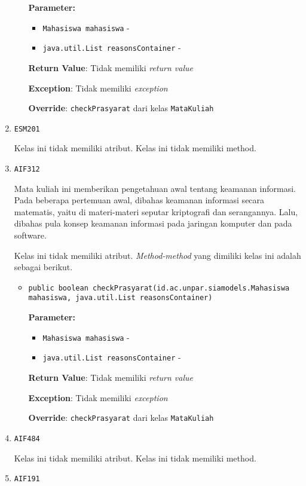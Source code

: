 \documentclass{article}
\begin{document}
\begin{enumerate}
\begin{itemize}
\textbf{Parameter:}
\begin{itemize}
\item \texttt{Mahasiswa mahasiswa} - 
\item \texttt{java.util.List reasonsContainer} - 
\end{itemize}
\textbf{Return Value}: Tidak memiliki \textit{return value}

\textbf{Exception}: Tidak memiliki \textit{exception}

\textbf{Override}: \texttt{checkPrasyarat} dari kelas \texttt{MataKuliah}

\end{itemize}
\item \texttt{ESM201}



Kelas ini tidak memiliki atribut. Kelas ini tidak memiliki method. \item \texttt{AIF312}

Mata kuliah ini memberikan pengetahuan awal tentang keamanan informasi. Pada
 beberapa pertemuan awal, dibahas keamanan informasi secara matematis, yaitu
 di materi-materi seputar kriptografi dan serangannya. Lalu, dibahas pula
 konsep keamanan informasi pada jaringan komputer dan pada software.

Kelas ini tidak memiliki atribut. \textit{Method-method} yang dimiliki kelas ini adalah sebagai berikut.
\begin{itemize}
\item \texttt{public boolean checkPrasyarat(id.ac.unpar.siamodels.Mahasiswa mahasiswa, java.util.List reasonsContainer)}

\textbf{Parameter:}
\begin{itemize}
\item \texttt{Mahasiswa mahasiswa} - 
\item \texttt{java.util.List reasonsContainer} - 
\end{itemize}
\textbf{Return Value}: Tidak memiliki \textit{return value}

\textbf{Exception}: Tidak memiliki \textit{exception}

\textbf{Override}: \texttt{checkPrasyarat} dari kelas \texttt{MataKuliah}

\end{itemize}
\item \texttt{AIF484}



Kelas ini tidak memiliki atribut. Kelas ini tidak memiliki method. \item \texttt{AIF191}




\end{enumerate}
\end{document}
